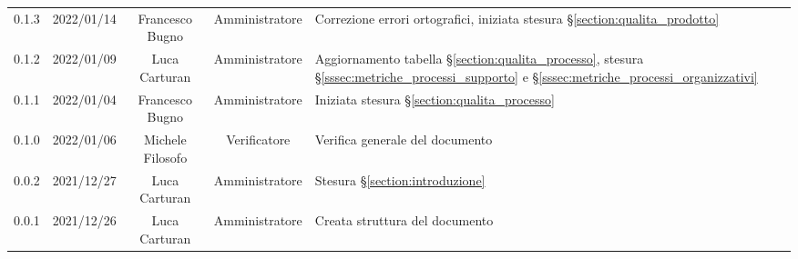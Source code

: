 \begin{center}
\begin{longtable}[c]{c | c | c | c | p{5cm}}
		0.1.3 & 2022/01/14 & Francesco Bugno & Amministratore & Correzione errori ortografici, iniziata stesura §\ref{section:qualita_prodotto}\\
		0.1.2 & 2022/01/09 & Luca Carturan & Amministratore & Aggiornamento tabella §\ref{section:qualita_processo}, stesura §\ref{sssec:metriche_processi_supporto} e §\ref{sssec:metriche_processi_organizzativi}\\
		0.1.1 & 2022/01/04 & Francesco Bugno & Amministratore & Iniziata stesura §\ref{section:qualita_processo}\\
		0.1.0 & 2022/01/06 & Michele Filosofo & Verificatore & Verifica generale del documento \\
		0.0.2 & 2021/12/27 & Luca Carturan & Amministratore & Stesura §\ref{section:introduzione}\\
		0.0.1 & 2021/12/26 & Luca Carturan & Amministratore & Creata struttura del documento
	\end{longtable}
\end{center}